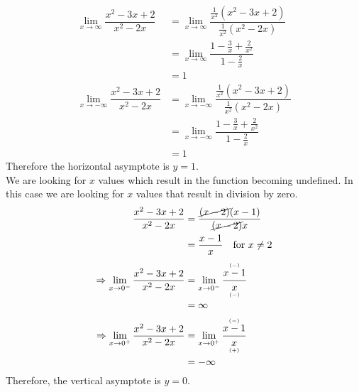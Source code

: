 \documentclass{hwset}
\newcommand{\mtiny}[1]{\mbox{\tiny $#1$}}
\begin{document}
\be
	\item
	\begin{solution}
		\begin{align*}
			\lim_{x\to \infty} \dfrac{x^2-3x+2}{x^2-2x} &= \lim_{x\to \infty}
				\dfrac{\frac{1}{x^2}\left(x^2-3x+2\right)}{\frac{1}{x^2}\left(x^2-2x\right)} \\
			&= \lim_{x\to \infty} \dfrac{1 - \frac{3}{x} + \frac{2}{x^2}}{1 -
				\frac{2}{x}} \\
			&= 1 \\
			\lim_{x\to -\infty} \dfrac{x^2-3x+2}{x^2-2x} &= \lim_{x\to -\infty}
				\dfrac{\frac{1}{x^2}\left(x^2-3x+2\right)}{\frac{1}{x^2}\left(x^2-2x\right)} \\
			&= \lim_{x\to -\infty} \dfrac{1 - \frac{3}{x} + \frac{2}{x^2}}{1 -
				\frac{2}{x}} \\
			&= 1
		\end{align*}
		Therefore the horizontal asymptote is $\boxed{y=1}$. \\
		We are looking for $x$ values which result in the function becoming
		undefined. In this case we are looking for $x$ values that result in
		division by zero.
		\begin{align*}
			\dfrac{x^2-3x+2}{x^2-2x} &= \dfrac{\cancel{(x-2)}(x-1)}{\cancel{(x-2)}x} \\
			&= \dfrac{x-1}{x} \quad \text{for } x\ne 2 \\
			\Rightarrow \lim_{x\to 0^-} \dfrac{x^2-3x+2}{x^2-2x} &= \lim_{x\to 0^-}
				\dfrac{\begin{matrix}\mtiny{(-)} \\[-0.3em]
				x-1\end{matrix}}{\begin{matrix}x \\[-0.6em] \mtiny{(-)}\end{matrix}} \\
			&= \infty \\
			\Rightarrow \lim_{x\to 0^+} \dfrac{x^2-3x+2}{x^2-2x} &= \lim_{x\to 0^+}
				\dfrac{\begin{matrix}\mtiny{(-)} \\[-0.3em]
				x-1\end{matrix}}{\begin{matrix}x \\[-0.6em] \mtiny{(+)}\end{matrix}} \\
			&= -\infty 
		\end{align*}
		Therefore, the vertical asymptote is $\boxed{y=0}$.
	\end{solution}
\end{document}
